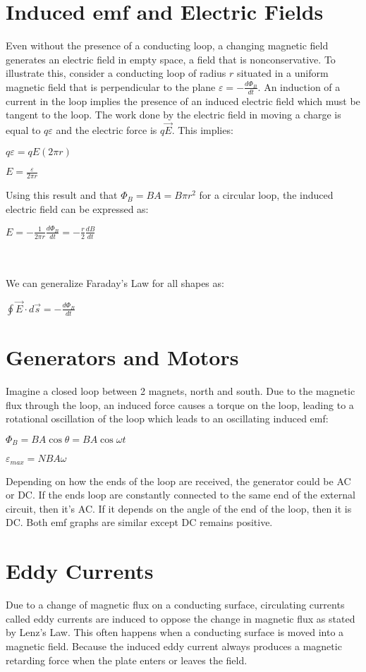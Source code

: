 \documentclass{report}
\begin{document}
	\section{Induced emf and Electric Fields}
		Even without the presence of a conducting loop, a changing magnetic field generates an electric field in empty space, a field that is nonconservative. To illustrate this, consider a conducting loop of radius $r$ situated in a uniform magnetic field that is perpendicular to the plane $\varepsilon = -\frac{d\Phi_B}{dt}$. An induction of a current in the loop implies the presence of an induced electric field which must be tangent to the loop. The work done by the electric field in moving a charge is equal to $q\varepsilon$ and the electric force is $q\vec{E}$. This implies:\\
		\centerline{$q\varepsilon = qE(2\pi r)$}
		\centerline{$E = \frac{\varepsilon}{2\pi r}$}
		Using this result and that $\Phi_B = BA = B\pi r^2$ for a circular loop, the induced electric field can be expressed as:\\
		\centerline{$E = -\frac{1}{2\pi r} \frac{d\Phi_B}{dt} = - \frac{r}{2} \frac{dB}{dt}$}
		\\
		\\
		We can generalize Faraday's Law for all shapes as:\\
		\centerline{$\oint \vec{E} \cdot d\vec{s} = - \frac{d\Phi_B}{dt}$}
	\section{Generators and Motors}
		Imagine a closed loop between 2 magnets, north and south. Due to the magnetic flux through the loop, an induced force causes a torque on the loop, leading to a rotational oscillation of the loop which leads to an oscillating induced emf:\\
		\centerline{$\Phi_B = BA \cos \theta = BA\cos \omega t$}
		\centerline{$\varepsilon_{max} = NBA\omega$}
		Depending on how the ends of the loop are received, the generator could be AC or DC. If the ends loop are constantly connected to the same end of the external circuit, then it's AC. If it depends on the angle of the end of the loop, then it is DC. Both emf graphs are similar except DC remains positive.
	\section{Eddy Currents}
		Due to a change of magnetic flux on a conducting surface, circulating currents called eddy currents are induced to oppose the change in magnetic flux as stated by Lenz's Law. This often happens when a conducting surface is moved into a magnetic field. Because the induced eddy current always produces a magnetic retarding force when the plate enters or leaves the field.
\end{document}
